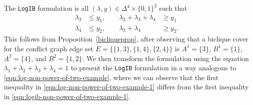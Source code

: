 \documentclass[opre,nonblindrev]{informs3} %
\newcommand{\LogIB}{\texttt{LogIB}}
\begin{document}
\begin{APPENDICES}
The \LogIB{} formulation is all $(\lambda,y) \in \Delta^4 \times \{0,1\}^2$ such that
\begin{subequations}\label{eqn:logib-non-power-of-two-example}
\begin{alignat}{2}
    \lambda_3 &\leq y_1, \quad\quad \lambda_2 + \lambda_3 + \lambda_4 &\geq y_1 \label{eqn:logib-non-power-of-two-example-1} \\
    \lambda_4 &\leq y_2, \quad\quad \lambda_3 + \lambda_4 &\geq y_2.
\end{alignat}
\end{subequations}
This follows from Proposition~\ref{bicliqueprop}, after observing that a biclique cover for the conflict graph edge set $E = \{\{1,3\},\{1,4\},\{2,4\}\}$ is $A^1=\{3\}$, $B^1=\{1\}$, $A^2=\{4\}$, and $B^2=\{1,2\}$. We then transform the formulation using the equation $\lambda_1+\lambda_2+\lambda_3+\lambda_4=1$ to present the \LogIB{} formulation in a way analogous to \eqref{eqn:log-non-power-of-two-example}, where we can observe that the first inequality in \eqref{eqn:log-non-power-of-two-example-1} differs from the first inequality in \eqref{eqn:logib-non-power-of-two-example-1}.


\end{APPENDICES}
\end{document}
